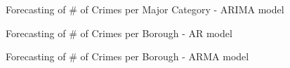 \documentclass[12pt]{beamer}
\begin{document}
        \begin{frame}{Forecasting of \# of Crimes per Major Category - ARIMA model}
            \begin{figure}
                \centering
            \end{figure}
        \end{frame}

        \begin{frame}{Forecasting of \# of Crimes per Borough - AR model}
            \begin{figure}
                \centering
            \end{figure}
        \end{frame}

        \begin{frame}{Forecasting of \# of Crimes per Borough - ARMA model}
            \begin{figure}
                \centering
            \end{figure}
        \end{frame}
\end{document}
